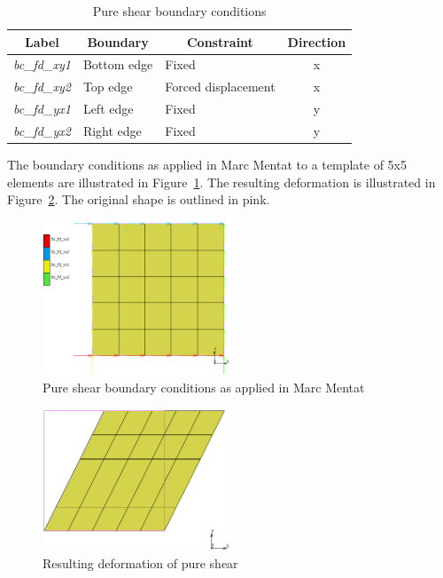 \begin{table}[H]
\centering
\begin{tabular}{@{}lllc@{}}
\toprule
\multicolumn{1}{c}{\textbf{Label}} & \multicolumn{1}{c}{\textbf{Boundary}} & \multicolumn{1}{c}{\textbf{Constraint}} & \textbf{Direction} \\ \midrule
\textit{bc\_fd\_xy1} & Bottom edge & Fixed               & x \\
\textit{bc\_fd\_xy2} & Top edge    & Forced displacement & x \\
\textit{bc\_fd\_yx1} & Left edge   & Fixed               & y \\
\textit{bc\_fd\_yx2} & Right edge  & Fixed				 & y \\ \bottomrule
\end{tabular}
\caption{Pure shear boundary conditions \cite{Kim2015}}
\label{tab:c3}
\end{table}

The boundary conditions as applied in Marc Mentat to a template of 5x5 elements are illustrated in Figure~\ref{fig:c3bc}. The resulting deformation is illustrated in Figure~\ref{fig:c3def}. The original shape is outlined in pink.

\begin{figure}[H]
	\centering
	\includegraphics[width=0.5\textwidth]{C3BC.png}
	\caption{Pure shear boundary conditions as applied in Marc Mentat}
	\label{fig:c3bc}
\end{figure}

\begin{figure}[H]
	\centering
	\includegraphics[width=0.5\textwidth]{C3Def.png}
	\caption{Resulting deformation of pure shear}
	\label{fig:c3def}
\end{figure}

